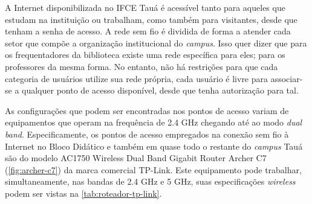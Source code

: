 \begin{figure}[H]
	\centering
\end{figure}

A Internet disponibilizada no IFCE Tauá é acessível tanto para aqueles que estudam na instituição ou trabalham, como também para visitantes, desde que tenham a senha de acesso. A rede sem fio é dividida de forma a atender cada setor que compõe a organização institucional do \textit{campus}. Isso quer dizer que para os frequentadores da biblioteca existe uma rede específica para eles; para os professores da mesma forma. No entanto, não há restrições para que cada categoria de usuários utilize sua rede própria, cada usuário é livre para associar-se a qualquer ponto de acesso disponível, desde que tenha autorização para tal.

As configurações que podem ser encontradas nos pontos de acesso variam de equipamentos que operam na frequência de 2.4 GHz chegando até ao modo \textit{dual band}. Especificamente, os pontos de acesso empregados na conexão sem fio à Internet no Bloco Didático e também em quase todo o restante do \textit{campus} Tauá são do modelo AC1750 Wireless Dual Band Gigabit Router Archer C7 (\autoref{fig:archer-c7}) da marca comercial TP-Link. Este equipamento pode trabalhar, simultaneamente, nas bandas de 2.4 GHz e 5 GHz, suas especificações \textit{wireless} podem ser vistas na \autoref{tab:roteador-tp-link}.

